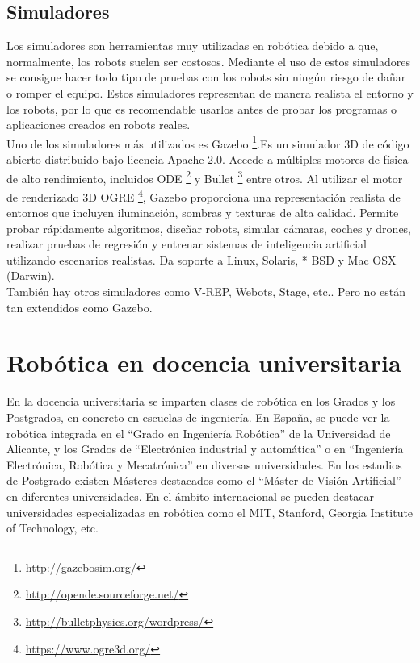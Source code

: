 \subsection{Simuladores}
Los simuladores son herramientas muy utilizadas en robótica debido a que, normalmente, los robots suelen ser costosos. Mediante el uso de estos simuladores se consigue hacer todo tipo de pruebas con los robots sin ningún riesgo de dañar o romper el equipo. Estos simuladores representan de manera realista el entorno y los robots, por lo que es recomendable usarlos antes de probar los programas o aplicaciones creados en robots reales. \\

Uno de los simuladores más utilizados es Gazebo \footnote{\url{http://gazebosim.org/}}.Es un simulador 3D de código abierto distribuido bajo licencia Apache 2.0. Accede a múltiples motores de física de alto rendimiento, incluidos ODE \footnote{\url{http://opende.sourceforge.net/}} y Bullet \footnote{\url{http://bulletphysics.org/wordpress/}} entre otros. Al utilizar el motor de renderizado 3D OGRE \footnote{\url{https://www.ogre3d.org/}}, Gazebo proporciona una representación realista de entornos que incluyen iluminación, sombras y texturas de alta calidad. Permite probar rápidamente algoritmos, diseñar robots, simular cámaras, coches y drones, realizar pruebas de regresión y entrenar sistemas de inteligencia artificial utilizando escenarios realistas. Da soporte a Linux, Solaris, * BSD y Mac OSX (Darwin).\\
	
También hay otros simuladores como V-REP, Webots, Stage, etc.. Pero no están tan extendidos como Gazebo.

\section{Robótica en docencia universitaria}

En la docencia universitaria se imparten clases de robótica en los Grados y los Postgrados, en concreto en escuelas de ingeniería. En España, se puede ver la robótica integrada en el ``Grado en Ingeniería Robótica'' de la Universidad de Alicante, y los Grados de ``Electrónica industrial y automática'' o en ``Ingeniería Electrónica, Robótica y Mecatrónica'' en diversas universidades. En los estudios de Postgrado existen Másteres destacados como el ``Máster de Visión Artificial'' en diferentes universidades. En el ámbito internacional se pueden destacar universidades especializadas en robótica como el MIT, Stanford, Georgia Institute of Technology, etc. \\

